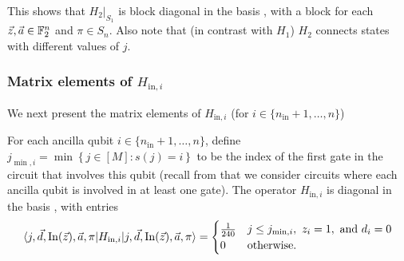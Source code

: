 \documentclass[../thesis-main/thesis-main]{subfiles}
\begin{document}
This shows that $H_{2}|_{S_{1}}$ is block diagonal in the basis , with a block for
each $\vec{z},\vec{a}\in\mathbb{F}_2^{n}$ and $\pi\in S_n$. Also note that (in contrast
with $H_{1}$) $H_{2}$ connects states with different values of $j$.

\subsubsection{Matrix elements of $H_{\text{in},i}$}

We next present the matrix elements of $H_{\text{in},i}$ (for
$i\in\{n_{\text{in}}+1,\ldots,n\}$) 

\begin{mdframed}[frametitle=Matrix elements of $H_{\text{in},i}$]
For each ancilla qubit $i\in\{n_{\text{in}}+1,\ldots,n\}$, define  $j_{\min,i}=\min\left\{ j\in[M]\colon s(j)=i\right\}$ to be the index of the first gate in the circuit that involves this qubit (recall from  that we consider circuits where each ancilla qubit is involved in at least one gate). The operator $H_{\text{in},i}$ is diagonal in the basis , with entries
\begin{equation}
\langle j,\vec{d},\operatorname{In}(\vec{z}),\vec{a},\pi|H_{\text{in},i}|j,\vec{d},\operatorname{In}(\vec{z}),\vec{a},\pi\rangle=\begin{cases}
\frac{1}{240} & j\leq j_{\min,i},\text{ }z_{i}=1,\text{ and }d_{i}=0\\
0 & \text{otherwise.}
\end{cases}\label{eq:Hin_mat_els}
\end{equation}
\end{mdframed}
\end{document}
